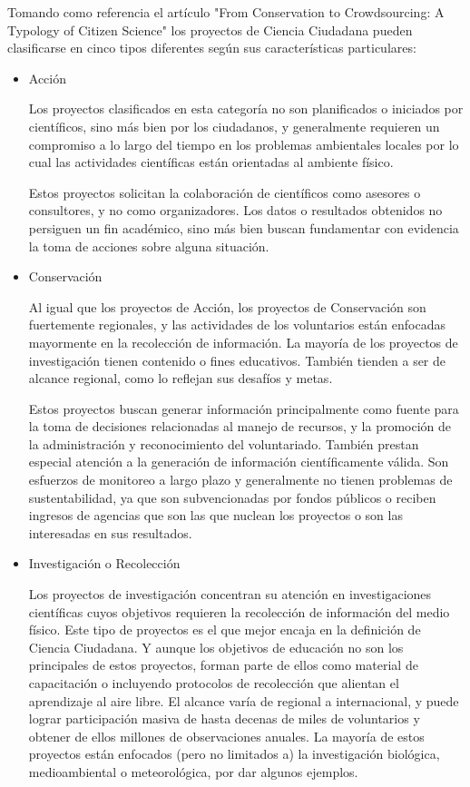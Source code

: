 	Tomando como referencia el artículo "From Conservation to Crowdsourcing: A Typology of Citizen Science" los proyectos de Ciencia Ciudadana pueden clasificarse en cinco tipos diferentes según sus características particulares:

\begin{itemize}
	\item {Acción}
		
		Los proyectos clasificados en esta categoría no son planificados o iniciados por científicos, sino más bien por los ciudadanos, y generalmente requieren un compromiso a lo largo del tiempo en los problemas ambientales locales por lo cual las actividades científicas están orientadas al ambiente físico. 
		
		Estos proyectos solicitan la colaboración de científicos como asesores o consultores, y no como organizadores. Los datos o resultados obtenidos no persiguen un fin académico, sino más bien buscan fundamentar con evidencia la toma de acciones sobre alguna situación. 
	\item {Conservación} 
	
	Al igual que los proyectos de Acción, los proyectos de Conservación son fuertemente regionales, y las actividades de los voluntarios están enfocadas mayormente en la recolección de información. La mayoría de los proyectos de investigación tienen contenido o fines educativos. También tienden a ser de alcance regional, como lo reflejan sus desafíos y metas.
	
	Estos proyectos buscan generar información principalmente como fuente para la toma de decisiones relacionadas al manejo de recursos, y la promoción de la administración y reconocimiento del voluntariado. También prestan especial atención a la generación de información científicamente válida. Son esfuerzos de monitoreo a largo plazo y generalmente no tienen problemas de sustentabilidad, ya que son subvencionadas por fondos públicos o reciben ingresos de agencias que son las que nuclean los proyectos o son las interesadas en sus resultados.
	
	\item {Investigación o Recolección} 
	
	Los proyectos de investigación concentran su atención en investigaciones científicas cuyos objetivos requieren la recolección de información del medio físico. Este tipo de proyectos es el que mejor encaja en la definición de Ciencia Ciudadana. Y aunque los objetivos de educación no son los principales de estos proyectos, forman parte de ellos como material de capacitación o incluyendo protocolos de recolección que alientan el aprendizaje al aire libre. El alcance varía de regional a internacional, y puede lograr participación masiva de hasta decenas de miles de voluntarios y obtener de ellos millones de observaciones anuales. La mayoría de estos proyectos están enfocados (pero no limitados a) la investigación biológica, medioambiental o meteorológica, por dar algunos ejemplos. 
	

\end{itemize}
